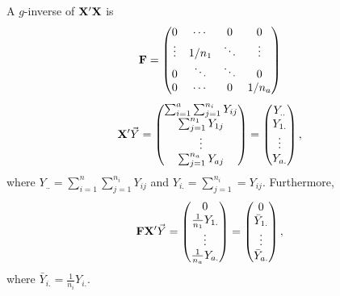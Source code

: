 A $ g $-inverse of $ \mathbf{X}'\mathbf{X} $ is
\[ \mathbf{F}=\begin{pmatrix}
        0      & \cdots & 0      & 0      \\
        \vdots & 1/n_1  & \ddots & \vdots \\
        0      & \ddots & \ddots & 0      \\
        0      & \cdots & 0      & 1/n_a
    \end{pmatrix} \]
\[ \mathbf{X}'\vec{Y}=\begin{pmatrix}
        \sum_{i=1}^{a}\sum_{j=1}^{n_i}Y_{ij} \\
        \sum_{j=1}^{n_1}Y_{1j}               \\
        \vdots                               \\
        \sum_{j=1}^{n_a}Y_{aj}
    \end{pmatrix}=\begin{pmatrix}
        Y_{..} \\
        Y_{1.} \\
        \vdots \\
        Y_{a.}
    \end{pmatrix}, \]
where $ Y_{..}=\sum_{i=1}^{n}\sum_{j=1}^{n_i}Y_{ij} $
and $ Y_{i.}=\sum_{j=1}^{n_i}=Y_{ij} $. Furthermore,
\[ \mathbf{F}\mathbf{X}'\vec{Y}=\begin{pmatrix}
        0                   \\
        \frac{1}{n_1}Y_{1.} \\
        \vdots              \\
        \frac{1}{n_a}Y_{a.}
    \end{pmatrix}=\begin{pmatrix}
        0            \\
        \bar{Y}_{1.} \\
        \vdots       \\
        \bar{Y}_{a.}
    \end{pmatrix}, \]
where $ \bar{Y}_{i.}=\frac{1}{n_i}Y_{i.} $.